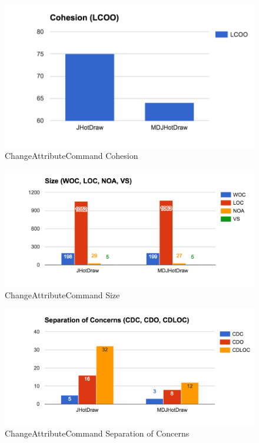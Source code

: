 \begin{figure}[H]
	\centering
	\includegraphics[scale=0.82]{figures/metrics/Metric_Observer_Cohesion.png}
	\caption{ChangeAttributeCommand Cohesion}
  	\label{fig:ChangeAttributeCommand Cohesion}
\end{figure}

\begin{figure}[H]
	\centering
	\includegraphics[scale=0.81]{figures/metrics/Metric_Undo_Size.png}
	\caption{ChangeAttributeCommand Size}
  	\label{fig:ChangeAttributeCommand Size}
\end{figure}

\begin{figure}[H]
	\centering
	\includegraphics[scale=0.81]{figures/metrics/Metric_Undo_SoC.png}
	\caption{ChangeAttributeCommand Separation of Concerns}
  	\label{fig:ChangeAttributeCommand SoC}
\end{figure}
